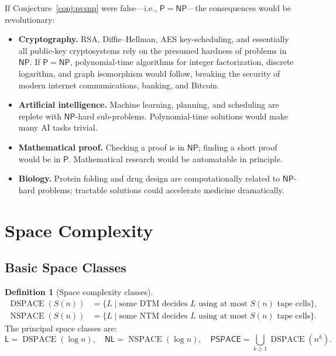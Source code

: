 \documentclass[12pt,a4paper]{amsart}
\theoremstyle{definition}
\newtheorem{definition}[theorem]{Definition}
\newcommand{\Pclass}{\mathsf{P}}
\newcommand{\NP}{\mathsf{NP}}
\newcommand{\PSPACE}{\mathsf{PSPACE}}
\newcommand{\Lclass}{\mathsf{L}}
\newcommand{\NL}{\mathsf{NL}}
\DeclareMathOperator{\DSPACE}{DSPACE}
\DeclareMathOperator{\NSPACE}{NSPACE}
\begin{document}
If Conjecture~\ref{conj:pvsnp} were false---i.e., $\Pclass = \NP$---the
consequences would be revolutionary:

\begin{itemize}
  \item \textbf{Cryptography.}  RSA, Diffie--Hellman, AES key-scheduling, and
    essentially all public-key cryptosystems rely on the presumed hardness of
    problems in $\NP$.  If $\Pclass=\NP$, polynomial-time algorithms for
    integer factorization, discrete logarithm, and graph isomorphism would
    follow, breaking the security of modern internet communications, banking,
    and Bitcoin.
  \item \textbf{Artificial intelligence.}  Machine learning, planning, and
    scheduling are replete with $\NP$-hard sub-problems.  Polynomial-time
    solutions would make many AI tasks trivial.
  \item \textbf{Mathematical proof.}  Checking a proof is in $\NP$; finding a
    short proof would be in $\Pclass$.  Mathematical research would be
    automatable in principle.
  \item \textbf{Biology.}  Protein folding and drug design are computationally
    related to $\NP$-hard problems; tractable solutions could accelerate
    medicine dramatically.
\end{itemize}

\section{Space Complexity}
\label{sec:space}

\subsection{Basic Space Classes}

\begin{definition}[Space complexity classes]
\begin{align*}
  \DSPACE(S(n)) &= \{L \mid \text{some DTM decides }L\text{ using at most }S(n)\text{ tape cells}\},\\
  \NSPACE(S(n)) &= \{L \mid \text{some NTM decides }L\text{ using at most }S(n)\text{ tape cells}\}.
\end{align*}
The principal space classes are:
\[
  \Lclass = \DSPACE(\log n),\quad
  \NL = \NSPACE(\log n),\quad
  \PSPACE = \bigcup_{k\geq 1}\DSPACE(n^k).
\]
\end{definition}
\end{document}
